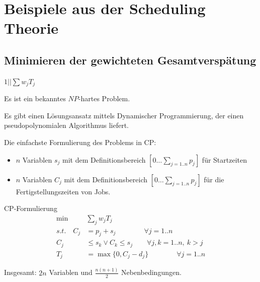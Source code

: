 \documentclass[hyperref={pdfpagelabels=false}]{beamer}
\newcommand{\inhalt}{\frame{   \frametitle{Überblick}   \tableofcontents[currentsection]}}
\begin{document}
\section{Beispiele aus der Scheduling Theorie}
\inhalt
\subsection{Minimieren der gewichteten Gesamtverspätung}
\begin{frame}[allowframebreaks]{$1||\sum{w_jT_j}$}

Es ist ein bekanntes {\color{darkred}$NP$-hartes Problem}. 

\begin{block}{}
Es gibt einen Lösungsansatz mittels {\color{darkred}Dynamischer Programmierung}, der einen pseudopolynomialen Algorithmus liefert.
\end{block}
\vspace{10pt}
Die einfachste Formulierung des Problems in CP:
\begin{itemize}
\item $n$ Variablen $s_j$ mit dem Definitionsbereich $[0\dots \sum_{j=1..n}p_j]$ für Startzeiten
\item $n$ Variablen $C_j$ mit dem Definitionsbereich $[0\dots \sum_{j=1..n}p_j]$ für die Fertigstellungszeiten von Jobs.
\end{itemize}

\vspace{20pt}

\begin{block}{CP-Formulierung}
\begin{align}
 \min & \sum_{j}{w_jT_j} \nonumber \\
 s.t.\quad C_j & = p_j + s_j\qquad\qquad \forall j=1..n \nonumber \\
 C_j  & \le s_k \vee  C_k \le s_j \qquad \forall j,k=1..n,\ k>j \nonumber \\
 T_j & = \max\{0, C_j - d_j\} \qquad\qquad \forall j=1..n \nonumber
 \end{align}
\end{block}

Insgesamt: $2n$ Variablen und $\frac{n(n+1)}{2}$ Nebenbedingungen.

\newpage


\end{frame}
\end{document}
